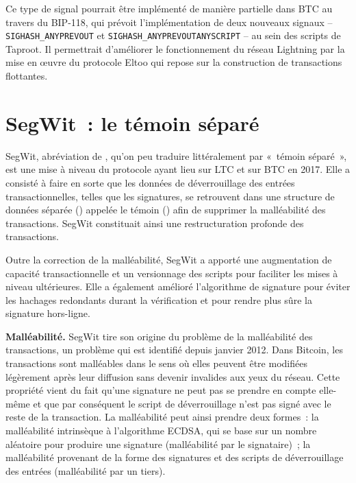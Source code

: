 Ce type de signal pourrait être implémenté de manière partielle dans BTC au travers du BIP-118, qui prévoit l'implémentation de deux nouveaux signaux -- \texttt{SIGHASH\_ANYPREVOUT} et \texttt{SIGHASH\_ANYPREVOUTANYSCRIPT} -- au sein des scripts de Taproot. Il permettrait d'améliorer le fonctionnement du réseau Lightning par la mise en œuvre du protocole Eltoo qui repose sur la construction de transactions flottantes.

\section*{SegWit~: le témoin séparé}

SegWit, abréviation de , qu'on peu traduire littéralement par «~témoin séparé~», est une mise à niveau du protocole ayant lieu sur LTC et sur BTC en 2017. Elle a consisté à faire en sorte que les données de déverrouillage des entrées transactionnelles, telles que les signatures, se retrouvent dans une structure de données séparée () appelée le témoin () afin de supprimer la malléabilité des transactions. SegWit constituait ainsi une restructuration profonde des transactions.

Outre la correction de la malléabilité, SegWit a apporté une augmentation de capacité transactionnelle et un versionnage des scripts pour faciliter les mises à niveau ultérieures. Elle a également amélioré l'algorithme de signature pour éviter les hachages redondants durant la vérification et pour rendre plus sûre la signature hors-ligne.


\textbf{Malléabilité.} SegWit tire son origine du problème de la malléabilité des transactions, un problème qui est identifié depuis janvier 2012. Dans Bitcoin, les transactions sont malléables dans le sens où elles peuvent être modifiées légèrement après leur diffusion sans devenir invalides aux yeux du réseau. Cette propriété vient du fait qu'une signature ne peut pas se prendre en compte elle-même et que par conséquent le script de déverrouillage n'est pas signé avec le reste de la transaction. La malléabilité peut ainsi prendre deux formes~: la malléabilité intrinsèque à l'algorithme ECDSA, qui se base sur un nombre aléatoire pour produire une signature (malléabilité par le signataire)~; la malléabilité provenant de la forme des signatures et des scripts de déverrouillage des entrées (malléabilité par un tiers).

